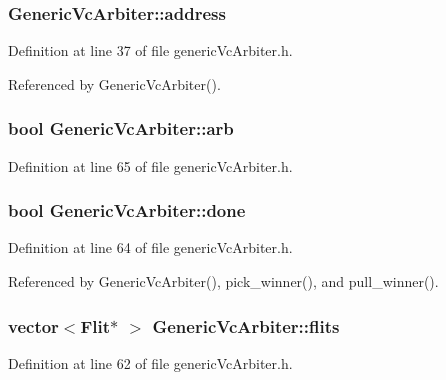 \subsubsection[{address}]{ {\bf GenericVcArbiter::address}}\label{classGenericVcArbiter_05e08631ed998739acf72c773bfda374}




Definition at line 37 of file genericVcArbiter.h.

Referenced by GenericVcArbiter().
\subsubsection[{arb}]{\setlength{\rightskip}{0pt plus 5cm}bool {\bf GenericVcArbiter::arb}\hspace{0.3cm}{\tt  [private]}}\label{classGenericVcArbiter_a0297bcb5e78e8ccfed15b025273ff9f}




Definition at line 65 of file genericVcArbiter.h.
\subsubsection[{done}]{\setlength{\rightskip}{0pt plus 5cm}bool {\bf GenericVcArbiter::done}\hspace{0.3cm}{\tt  [private]}}\label{classGenericVcArbiter_6d5b07856fdfec01e2a11966733f97e6}




Definition at line 64 of file genericVcArbiter.h.

Referenced by GenericVcArbiter(), pick\_\-winner(), and pull\_\-winner().
\subsubsection[{flits}]{\setlength{\rightskip}{0pt plus 5cm}vector$<${\bf Flit}$\ast$ $>$ {\bf GenericVcArbiter::flits}\hspace{0.3cm}{\tt  [private]}}\label{classGenericVcArbiter_d1e2667bb1e9dff025910f9f5f1234f9}




Definition at line 62 of file genericVcArbiter.h.

